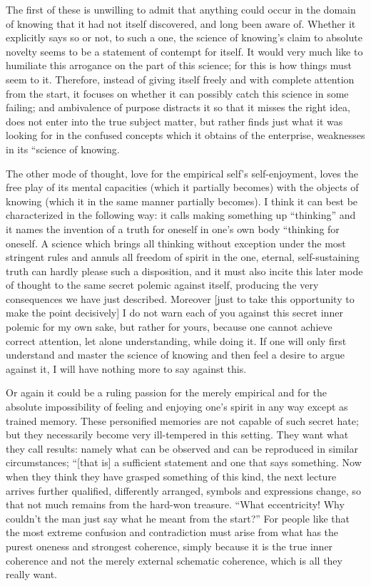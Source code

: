 The first of these is unwilling to admit
that anything could occur in the domain of knowing
that it had not itself discovered,
and long been aware of.
Whether it explicitly says so or not, to such a one,
the science of knowing’s claim to absolute novelty
seems to be a statement of contempt for itself.
It would very much like to humiliate
this arrogance on the part of this science;
for this is how things must seem to it.
Therefore, instead of giving itself freely
and with complete attention from the start,
it focuses on whether it can possibly catch
this science in some failing;
and ambivalence of purpose distracts it
so that it misses the right idea,
does not enter into the true subject matter,
but rather finds just what it was looking for
in the confused concepts
which it obtains of the enterprise,
weaknesses in its “science of knowing.

The other mode of thought,
love for the empirical self’s self-enjoyment,
loves the free play of its mental capacities
(which it partially becomes)
with the objects of knowing
(which it in the same manner partially becomes).
I think it can best be characterized in the following way:
it calls making something up “thinking”
and it names the invention of a truth
for oneself in one’s own body
“thinking for oneself.
A science which brings all
thinking without exception
under the most stringent rules
and annuls all freedom of spirit
in the one, eternal, self-sustaining truth
can hardly please such a disposition,
and it must also incite this later
mode of thought to the same
secret polemic against itself,
producing the very consequences we have just described.
Moreover [just to take this opportunity
to make the point decisively]
I do not warn each of you against
this secret inner polemic for my own sake,
but rather for yours,
because one cannot achieve correct attention,
let alone understanding,
while doing it.
If one will only first understand
and master the science of knowing
and then feel a desire to argue against it,
I will have nothing more to say against this.

Or again it could be a ruling passion
for the merely empirical
and for the absolute impossibility of
feeling and enjoying one’s spirit in any way
except as trained memory.
These personified memories are not capable of such secret hate;
but they necessarily become very ill-tempered in this setting.
They want what they call results:
namely what can be observed and
can be reproduced in similar circumstances;
“[that is] a sufficient statement and one that says something.
Now when they think they have grasped something of this kind,
the next lecture arrives further qualified,
differently arranged, symbols and expressions change,
so that not much remains from the hard-won treasure.
“What eccentricity! Why couldn’t the man
just say what he meant from the start?”
For people like that the most extreme confusion and contradiction
must arise from what has the purest oneness and strongest coherence,
simply because it is the true inner coherence
and not the merely external schematic coherence,
which is all they really want.

